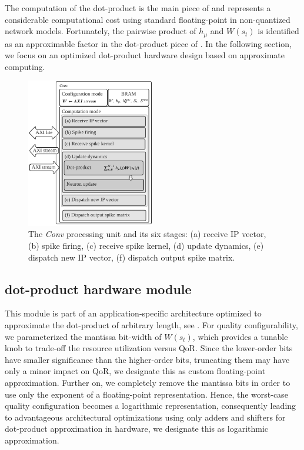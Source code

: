 The computation of the dot-product is the main piece of  and represents a considerable computational cost using standard floating-point in non-quantized network models. Fortunately, the pairwise product of $h_{\mu}$ and $W(s_t)$ is identified as an approximable factor in the dot-product piece of . In the following section, we focus on an optimized dot-product hardware design based on approximate computing.


\begin{figure}
	\centering
	\includegraphics[width=0.5\textwidth]{../figures/sbs_conv.pdf}
	\caption{The \emph{Conv} processing unit and its six stages: (a) receive IP vector, (b) spike firing, (c) receive spike kernel, (d) update dynamics, (e) dispatch new IP vector, (f) dispatch output spike matrix.}
	\label{fig:hw_conv}
\end{figure}

\subsection{dot-product hardware module}
This module is part of an application-specific architecture optimized to approximate the dot-product of arbitrary length, see . For quality configurability, we parameterized the mantissa bit-width of $W(s_t)$, which provides a tunable knob to trade-off the resource utilization versus QoR. Since the lower-order bits have smaller significance than the higher-order bits, truncating them may have only a minor impact on QoR, we designate this as custom floating-point approximation. Further on, we completely remove the mantissa bits in order to use only the exponent of a floating-point representation. Hence, the worst-case quality configuration becomes a logarithmic representation, consequently leading to advantageous architectural optimizations using only adders and shifters for dot-product approximation in hardware, we designate this as logarithmic approximation.


